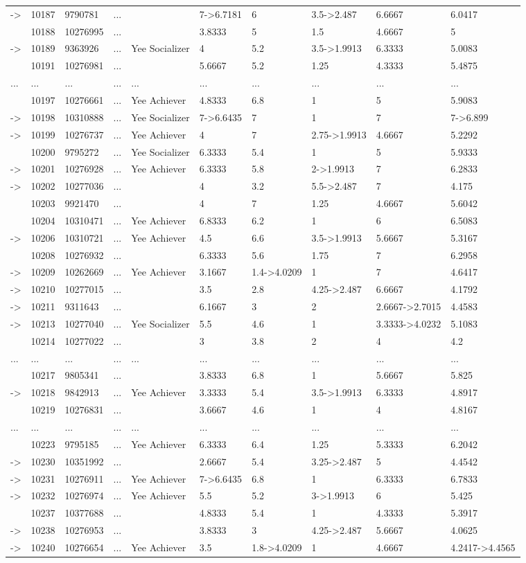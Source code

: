 \documentclass[6pt,a4paper]{article}
\begin{document}
\begin{landscape}
{\begin{longtable}{llllllllll}
-\textgreater &10187&9790781&...&&7-\textgreater 6.7181&6&3.5-\textgreater 2.487&6.6667&6.0417\tabularnewline
&10188&10276995&...&&3.8333&5&1.5&4.6667&5\tabularnewline
-\textgreater &10189&9363926&...&Yee Socializer&4&5.2&3.5-\textgreater 1.9913&6.3333&5.0083\tabularnewline
&10191&10276981&...&&5.6667&5.2&1.25&4.3333&5.4875\tabularnewline
...&...&...&...&...&...&...&...&...&...\tabularnewline
&10197&10276661&...&Yee Achiever&4.8333&6.8&1&5&5.9083\tabularnewline
-\textgreater &10198&10310888&...&Yee Socializer&7-\textgreater 6.6435&7&1&7&7-\textgreater 6.899\tabularnewline
-\textgreater &10199&10276737&...&Yee Achiever&4&7&2.75-\textgreater 1.9913&4.6667&5.2292\tabularnewline
&10200&9795272&...&Yee Socializer&6.3333&5.4&1&5&5.9333\tabularnewline
-\textgreater &10201&10276928&...&Yee Achiever&6.3333&5.8&2-\textgreater 1.9913&7&6.2833\tabularnewline
-\textgreater &10202&10277036&...&&4&3.2&5.5-\textgreater 2.487&7&4.175\tabularnewline
&10203&9921470&...&&4&7&1.25&4.6667&5.6042\tabularnewline
&10204&10310471&...&Yee Achiever&6.8333&6.2&1&6&6.5083\tabularnewline
-\textgreater &10206&10310721&...&Yee Achiever&4.5&6.6&3.5-\textgreater 1.9913&5.6667&5.3167\tabularnewline
&10208&10276932&...&&6.3333&5.6&1.75&7&6.2958\tabularnewline
-\textgreater &10209&10262669&...&Yee Achiever&3.1667&1.4-\textgreater 4.0209&1&7&4.6417\tabularnewline
-\textgreater &10210&10277015&...&&3.5&2.8&4.25-\textgreater 2.487&6.6667&4.1792\tabularnewline
-\textgreater &10211&9311643&...&&6.1667&3&2&2.6667-\textgreater 2.7015&4.4583\tabularnewline
-\textgreater &10213&10277040&...&Yee Socializer&5.5&4.6&1&3.3333-\textgreater 4.0232&5.1083\tabularnewline
&10214&10277022&...&&3&3.8&2&4&4.2\tabularnewline
...&...&...&...&...&...&...&...&...&...\tabularnewline
&10217&9805341&...&&3.8333&6.8&1&5.6667&5.825\tabularnewline
-\textgreater &10218&9842913&...&Yee Achiever&3.3333&5.4&3.5-\textgreater 1.9913&6.3333&4.8917\tabularnewline
&10219&10276831&...&&3.6667&4.6&1&4&4.8167\tabularnewline
...&...&...&...&...&...&...&...&...&...\tabularnewline
&10223&9795185&...&Yee Achiever&6.3333&6.4&1.25&5.3333&6.2042\tabularnewline
-\textgreater &10230&10351992&...&&2.6667&5.4&3.25-\textgreater 2.487&5&4.4542\tabularnewline
-\textgreater &10231&10276911&...&Yee Achiever&7-\textgreater 6.6435&6.8&1&6.3333&6.7833\tabularnewline
-\textgreater &10232&10276974&...&Yee Achiever&5.5&5.2&3-\textgreater 1.9913&6&5.425\tabularnewline
\newpage
&10237&10377688&...&&4.8333&5.4&1&4.3333&5.3917\tabularnewline
-\textgreater &10238&10276953&...&&3.8333&3&4.25-\textgreater 2.487&5.6667&4.0625\tabularnewline
-\textgreater &10240&10276654&...&Yee Achiever&3.5&1.8-\textgreater 4.0209&1&4.6667&4.2417-\textgreater 4.4565\tabularnewline
\hline
\end{longtable}}

\end{landscape}
\end{document}
